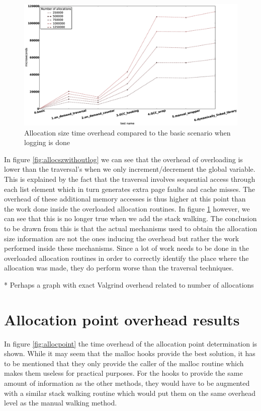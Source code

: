 \begin{figure}[htb]
\centering
\includegraphics[scale=0.5, width=\textwidth]{src/img/allocationsizewithlogging}
\caption{Allocation size time overhead compared to the basic scenario when logging is done}
\label{fig:allocszwithlog}
\end{figure}

In figure \ref{fig:allocszwithoutlog} we can see that the overhead of overloading is lower than the traversal's when we only increment/decrement the global variable. This is explained by the fact that the traversal involves sequential access through each list element which in turn generates extra page faults and cache misses. The overhead of these additional memory accesses is thus higher at this point than the work done inside the overloaded allocation routines. In figure \ref{fig:allocszwithlog} however, we can see that this is no longer true when we add the stack walking. The conclusion to be drawn from this is that the actual mechanisms used to obtain the allocation size information are not the ones inducing the overhead but rather the work performed inside these mechanisms. Since a lot of work needs to be done in the overloaded allocation routines in order to correctly identify the place where the allocation was made, they do perform worse than the traversal techniques.

* Perhaps a graph with exact Valgrind overhead related to number of allocations

\section{Allocation point overhead results}
\label{section:allocpt}

In figure \ref{fig:allocpoint} the time overhead of the allocation point determination is shown. While it may seem that the malloc hooks provide the best solution, it has to be mentioned that they only provide the caller of the malloc routine which makes them useless for practical purposes. For the hooks to provide the same amount of information as the other methods, they would have to be augmented with a similar stack walking routine which would put them on the same overhead level as the manual walking method.

